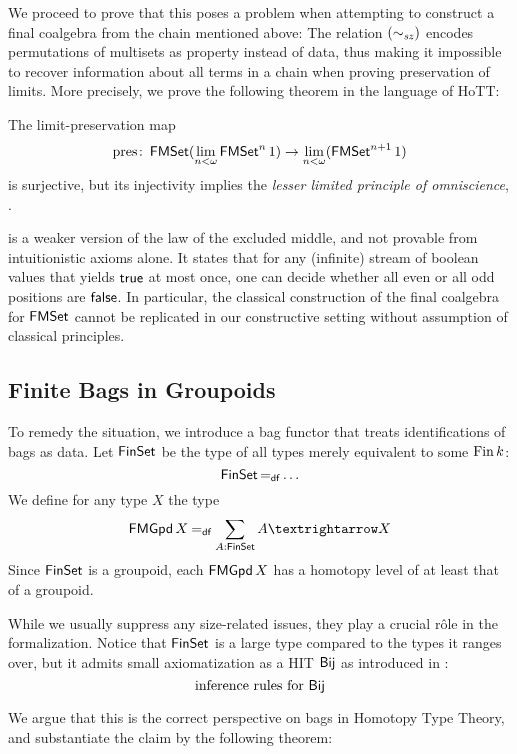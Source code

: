 \documentclass{easychair}
\begin{document}
  We proceed to prove that this poses a problem when attempting to construct a final coalgebra from the chain mentioned above:
  The relation $(\SymmetricAction{\Var{sz}}[][])$ encodes
  permutations of multisets as property instead of data,
  thus making it impossible to recover information about all terms in a chain
  when proving preservation of limits.
  More precisely, we prove the following theorem in the language of HoTT:

  \begin{theorem}\label{thm:InjPresImpliesLLPO}
    The limit-preservation map
    \[
        \operatorname{pres}\colon
            \operatorname{\mathsf{FMSet}} (\lim_{n < \omega} \operatorname{\mathsf{FMSet}}^n 1)
            \to
            \lim_{n < \omega} (\operatorname{\mathsf{FMSet}}^{n+1} 1)
    \]
    is surjective,
    but its injectivity implies the \emph{lesser limited principle of omniscience}, \LLPO.
  \end{theorem}
  \LLPO{} \cite[{Ch.\@ 1}]{Bridges1987} is a weaker version of the law of the excluded middle, and not
  provable from intuitionistic axioms alone.
  It states that for any (infinite) stream of boolean values that yields $\mathsf{true}$
  at most once, one can decide whether all even or all odd positions are $\mathsf{false}$.
  In particular, the classical construction of the final coalgebra for $\operatorname{\mathsf{FMSet}}$
  cannot be replicated in our constructive setting without assumption of classical principles.

  \subsection*{Finite Bags in Groupoids}

  To remedy the situation, we introduce a bag functor that treats identifications of bags as data.
  Let $\operatorname{\mathsf{FinSet}}$ be the type of all types merely equivalent to some $\operatorname{Fin} k$:
  \[
    \operatorname{\mathsf{FinSet}} \mathbin{=_\mathsf{df}}
      \ldots
  \]
  We define for any type $X$ the type
  \[
    \FMGpd X \DefEq
      \sum_{A : \FinSet} A → X
  \]
  Since $\operatorname{\mathsf{FinSet}}$ is a groupoid, each $\operatorname{\mathsf{FMGpd}} X$ has a homotopy level of at least that of a groupoid.

  While we usually suppress any size-related issues, they play a crucial r\^{o}le in the formalization.
  Notice that $\operatorname{\mathsf{FinSet}}$ is a large type compared to the types it ranges over,
  but it admits small axiomatization as a HIT $\operatorname{\mathsf{Bij}}$ as introduced in \cite{Finster2021}:
  \[
    \text{inference rules for $\operatorname{\mathsf{Bij}}$}
  \]

  We argue that this is the correct perspective on bags in Homotopy Type Theory,
  and substantiate the claim by the following theorem:
\end{document}
